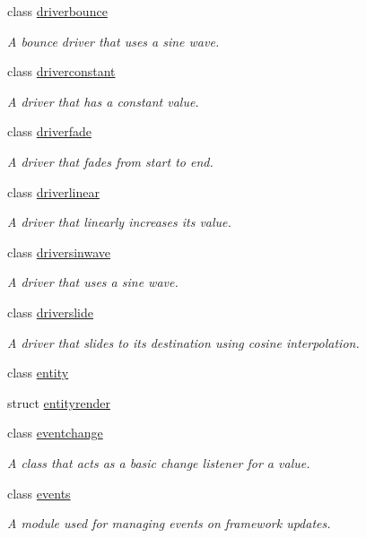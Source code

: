 \begin{DoxyCompactItemize}
class \hyperlink{classflounder_1_1driverbounce}{driverbounce}
\begin{DoxyCompactList}\small\item\em A bounce driver that uses a sine wave. \end{DoxyCompactList}\item 
class \hyperlink{classflounder_1_1driverconstant}{driverconstant}
\begin{DoxyCompactList}\small\item\em A driver that has a constant value. \end{DoxyCompactList}\item 
class \hyperlink{classflounder_1_1driverfade}{driverfade}
\begin{DoxyCompactList}\small\item\em A driver that fades from start to end. \end{DoxyCompactList}\item 
class \hyperlink{classflounder_1_1driverlinear}{driverlinear}
\begin{DoxyCompactList}\small\item\em A driver that linearly increases its value. \end{DoxyCompactList}\item 
class \hyperlink{classflounder_1_1driversinwave}{driversinwave}
\begin{DoxyCompactList}\small\item\em A driver that uses a sine wave. \end{DoxyCompactList}\item 
class \hyperlink{classflounder_1_1driverslide}{driverslide}
\begin{DoxyCompactList}\small\item\em A driver that slides to its destination using cosine interpolation. \end{DoxyCompactList}\item 
class \hyperlink{classflounder_1_1entity}{entity}
\item 
struct \hyperlink{structflounder_1_1entityrender}{entityrender}
\item 
class \hyperlink{classflounder_1_1eventchange}{eventchange}
\begin{DoxyCompactList}\small\item\em A class that acts as a basic change listener for a value. \end{DoxyCompactList}\item 
class \hyperlink{classflounder_1_1events}{events}
\begin{DoxyCompactList}\small\item\em A module used for managing events on framework updates. \end{DoxyCompactList}\item 

\end{DoxyCompactItemize}
